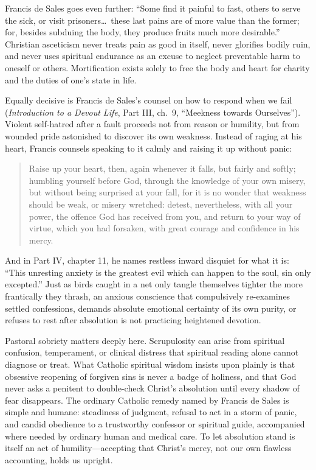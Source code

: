 Francis de Sales goes even further: ``Some find it painful to fast, others to serve the sick, or visit prisoners\dots\ these last pains are of more value than the former; for, besides subduing the body, they produce fruits much more desirable.'' Christian asceticism never treats pain as good in itself, never glorifies bodily ruin, and never uses spiritual endurance as an excuse to neglect preventable harm to oneself or others. Mortification exists solely to free the body and heart for charity and the duties of one's state in life.

Equally decisive is Francis de Sales's counsel on how to respond when we fail (\emph{Introduction to a Devout Life}, Part III, ch.\ 9, ``Meekness towards Ourselves''). Violent self-hatred after a fault proceeds not from reason or humility, but from wounded pride astonished to discover its own weakness. Instead of raging at his heart, Francis counsels speaking to it calmly and raising it up without panic:

\begin{quote}
Raise up your heart, then, again whenever it falls, but fairly and softly; humbling yourself before God, through the knowledge of your own misery, but without being surprised at your fall, for it is no wonder that weakness should be weak, or misery wretched: detest, nevertheless, with all your power, the offence God has received from you, and return to your way of virtue, which you had forsaken, with great courage and confidence in his mercy.
\end{quote}

And in Part IV, chapter 11, he names restless inward disquiet for what it is: ``This unresting anxiety is the greatest evil which can happen to the soul, sin only excepted.'' Just as birds caught in a net only tangle themselves tighter the more frantically they thrash, an anxious conscience that compulsively re-examines settled confessions, demands absolute emotional certainty of its own purity, or refuses to rest after absolution is not practicing heightened devotion.

Pastoral sobriety matters deeply here. Scrupulosity can arise from spiritual confusion, temperament, or clinical distress that spiritual reading alone cannot diagnose or treat. What Catholic spiritual wisdom insists upon plainly is that obsessive reopening of forgiven sins is never a badge of holiness, and that God never asks a penitent to double-check Christ's absolution until every shadow of fear disappears. The ordinary Catholic remedy named by Francis de Sales is simple and humane: steadiness of judgment, refusal to act in a storm of panic, and candid obedience to a trustworthy confessor or spiritual guide, accompanied where needed by ordinary human and medical care. To let absolution stand is itself an act of humility---accepting that Christ's mercy, not our own flawless accounting, holds us upright.
